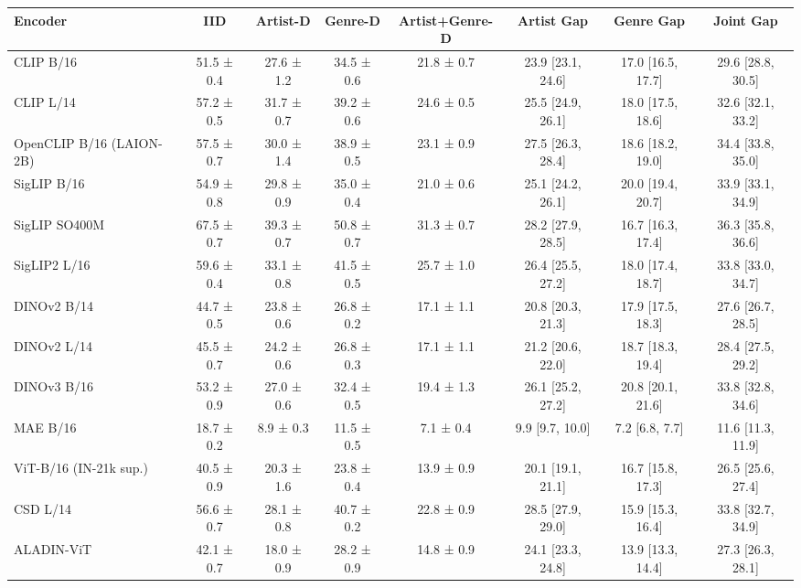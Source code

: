 \begin{tabular}{lccccccc}
\toprule
Encoder & IID & Artist-D & Genre-D & Artist+Genre-D & Artist Gap & Genre Gap & Joint Gap \\
\midrule
CLIP B/16 & 51.5 ± 0.4 & 27.6 ± 1.2 & 34.5 ± 0.6 & 21.8 ± 0.7 & 23.9 [23.1, 24.6] & 17.0 [16.5, 17.7] & 29.6 [28.8, 30.5] \\
CLIP L/14 & 57.2 ± 0.5 & 31.7 ± 0.7 & 39.2 ± 0.6 & 24.6 ± 0.5 & 25.5 [24.9, 26.1] & 18.0 [17.5, 18.6] & 32.6 [32.1, 33.2] \\
OpenCLIP B/16 (LAION-2B) & 57.5 ± 0.7 & 30.0 ± 1.4 & 38.9 ± 0.5 & 23.1 ± 0.9 & 27.5 [26.3, 28.4] & 18.6 [18.2, 19.0] & 34.4 [33.8, 35.0] \\
SigLIP B/16 & 54.9 ± 0.8 & 29.8 ± 0.9 & 35.0 ± 0.4 & 21.0 ± 0.6 & 25.1 [24.2, 26.1] & 20.0 [19.4, 20.7] & 33.9 [33.1, 34.9] \\
SigLIP SO400M & 67.5 ± 0.7 & 39.3 ± 0.7 & 50.8 ± 0.7 & 31.3 ± 0.7 & 28.2 [27.9, 28.5] & 16.7 [16.3, 17.4] & 36.3 [35.8, 36.6] \\
SigLIP2 L/16 & 59.6 ± 0.4 & 33.1 ± 0.8 & 41.5 ± 0.5 & 25.7 ± 1.0 & 26.4 [25.5, 27.2] & 18.0 [17.4, 18.7] & 33.8 [33.0, 34.7] \\
DINOv2 B/14 & 44.7 ± 0.5 & 23.8 ± 0.6 & 26.8 ± 0.2 & 17.1 ± 1.1 & 20.8 [20.3, 21.3] & 17.9 [17.5, 18.3] & 27.6 [26.7, 28.5] \\
DINOv2 L/14 & 45.5 ± 0.7 & 24.2 ± 0.6 & 26.8 ± 0.3 & 17.1 ± 1.1 & 21.2 [20.6, 22.0] & 18.7 [18.3, 19.4] & 28.4 [27.5, 29.2] \\
DINOv3 B/16 & 53.2 ± 0.9 & 27.0 ± 0.6 & 32.4 ± 0.5 & 19.4 ± 1.3 & 26.1 [25.2, 27.2] & 20.8 [20.1, 21.6] & 33.8 [32.8, 34.6] \\
MAE B/16 & 18.7 ± 0.2 & 8.9 ± 0.3 & 11.5 ± 0.5 & 7.1 ± 0.4 & 9.9 [9.7, 10.0] & 7.2 [6.8, 7.7] & 11.6 [11.3, 11.9] \\
ViT-B/16 (IN-21k sup.) & 40.5 ± 0.9 & 20.3 ± 1.6 & 23.8 ± 0.4 & 13.9 ± 0.9 & 20.1 [19.1, 21.1] & 16.7 [15.8, 17.3] & 26.5 [25.6, 27.4] \\
CSD L/14 & 56.6 ± 0.7 & 28.1 ± 0.8 & 40.7 ± 0.2 & 22.8 ± 0.9 & 28.5 [27.9, 29.0] & 15.9 [15.3, 16.4] & 33.8 [32.7, 34.9] \\
ALADIN-ViT & 42.1 ± 0.7 & 18.0 ± 0.9 & 28.2 ± 0.9 & 14.8 ± 0.9 & 24.1 [23.3, 24.8] & 13.9 [13.3, 14.4] & 27.3 [26.3, 28.1] \\
\bottomrule
\end{tabular}
